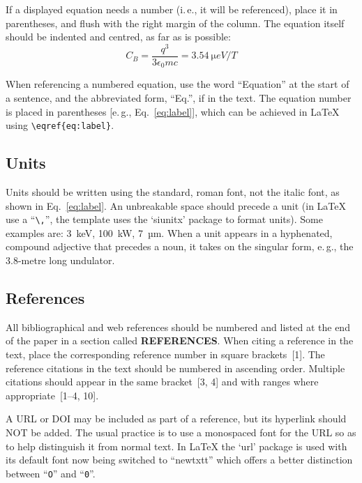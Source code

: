 If a displayed equation needs a number (i.\,e., it will be
referenced), place it in parentheses, and flush with the
right margin of the column. The equation itself should be
indented and centred, as far as is possible:
\begin{equation}\label{eq:label}
    C_B=\frac{q^3}{3\epsilon_{0} mc}=\SI{3.54}{\micro eV/T}
\end{equation}

When referencing a numbered equation, use the word
“Equation” at the start of a sentence, and the abbreviated
form, “Eq.”, if in the text. The equation number is placed
in parentheses [e.\,g., Eq.~\eqref{eq:label}], which can be 
achieved in \LaTeX{} using \verb|\eqref{eq:label}|.

\subsection{Units}
	
Units should be written using the standard, roman font,
not the italic font, as shown in Eq.~\eqref{eq:label}.
An unbreakable space should precede a unit (in \LaTeX{} use a “\verb|\,|”,
the template uses the ‘siunitx’ package to format units).
Some examples are: \SI{3}{keV},
\SI{100}{kW}, \SI{7}{µm}. When a unit appears in a hyphenated,
compound adjective that precedes a noun, it takes on the
singular form, e.\,g., the 3.8-metre long undulator.

\subsection{References}
%
%
All bibliographical and web references should be numbered and listed at the
end of the paper in a section called \textbf{REFERENCES}. When citing a
reference in the text, place the corresponding reference number in square
brackets~[1]. The reference citations in the text should be numbered
in ascending order. Multiple citations should appear in
the same bracket~[3, 4] and
with ranges where appropriate~[1--4, 10].

A URL or DOI may be included as part of a reference, but its
hyperlink should NOT be added. The usual practice is to
use a monospaced font for the URL so as to help distinguish
it from normal text. In \LaTeX{} the ‘url’ package is used with its 
default font now being switched to ``newtxtt'' which offers
a better distinction between ``\texttt{O}'' and ``\texttt{0}''.

